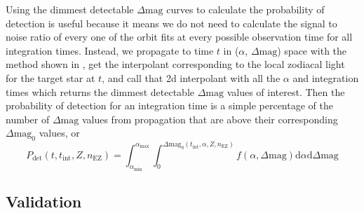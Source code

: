 Using the dimmest detectable $\Delta\textrm{mag}$ curves to calculate
the probability of detection is useful because it means we do not need to calculate
the signal to noise ratio of every one of the orbit fits at every possible
observation time for all integration times. Instead, we propagate to time $t$ in
($\alpha$, $\Delta\textrm{mag}$) space with the method shown in
, get the interpolant corresponding to the local zodiacal
light for the target star at $t$, and call that 2d interpolant with all the
$\alpha$ and integration times which returns the dimmest detectable
$\Delta\textrm{mag}$ values of interest. Then the probability of detection for
an integration time is a simple percentage of the number of
$\Delta\textrm{mag}$ values from propagation that are above their corresponding
$\Delta\textrm{mag}_0$ values, or
\begin{equation}
  P_\textrm{det}(t, t_\textrm{int}, Z, n_\textrm{EZ}) = 
  \int_{\alpha_\textrm{min}}^{\alpha_\textrm{max}} 
  \int_{0}^{\Delta\textrm{mag}_0(t_\textrm{int}, \alpha, Z, n_\textrm{EZ})}
  f(\alpha, \Delta\textrm{mag})\textrm{d}\alpha \textrm{d}\Delta\textrm{mag}
  \label{eq:comp_integral}
\end{equation}

\subsection{Validation}

